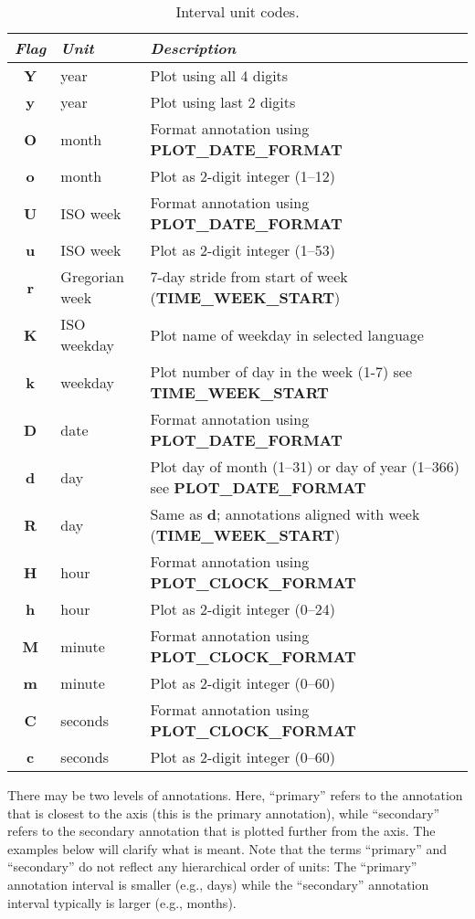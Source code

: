 \begin{table}[h]
\centering
\begin{tabular}{|c|l|l|} \hline
\emph{Flag}	& \emph{Unit} & \emph{Description} \\ \hline
\textbf{Y}	&	year		& Plot using all 4 digits \\ \hline
\textbf{y}	&	year		& Plot using last 2 digits \\ \hline
\textbf{O}	&	month		& Format annotation using \textbf{PLOT\_DATE\_FORMAT} \\ \hline
\textbf{o}	&	month		& Plot as 2-digit integer (1--12) \\ \hline
\textbf{U}	&	ISO week	& Format annotation using \textbf{PLOT\_DATE\_FORMAT} \\ \hline
\textbf{u}	&	ISO week	& Plot as 2-digit integer (1--53) \\ \hline
\textbf{r}	&	Gregorian week	& 7-day stride from start of week (\textbf{TIME\_WEEK\_START}) \\ \hline
\textbf{K}	&	ISO weekday	& Plot name of weekday in selected language \\ \hline
\textbf{k}	&	weekday		& Plot number of day in the week (1-7)  {see \bf TIME\_WEEK\_START}\\ \hline
\textbf{D}	&	date		& Format annotation using \textbf{PLOT\_DATE\_FORMAT} \\ \hline
\textbf{d}	&	day		& Plot day of month (1--31) or day of year (1--366) {see \bf PLOT\_DATE\_FORMAT} \\ \hline
\textbf{R}	&	day		& Same as \textbf{d}; annotations aligned with week (\textbf{TIME\_WEEK\_START})\\ \hline
\textbf{H}	&	hour		& Format annotation using \textbf{PLOT\_CLOCK\_FORMAT} \\ \hline
\textbf{h}	&	hour		& Plot as 2-digit integer (0--24) \\ \hline
\textbf{M}	&	minute		& Format annotation using \textbf{PLOT\_CLOCK\_FORMAT} \\ \hline
\textbf{m}	&	minute		& Plot as 2-digit integer (0--60) \\ \hline
\textbf{C}	&	seconds		& Format annotation using \textbf{PLOT\_CLOCK\_FORMAT} \\ \hline
\textbf{c}	&	seconds		& Plot as 2-digit integer (0--60) \\ \hline
\end{tabular}
\caption{Interval unit codes.}
\label{tbl:units}
\end{table}

There may be two levels of annotations.  Here, ``primary'' refers to the annotation
that is closest to the axis (this is the primary annotation), while ``secondary'' refers to the secondary
annotation that is plotted further from the axis.  The examples below
will clarify what is meant.  Note that the terms ``primary'' and ``secondary'' do not reflect any hierarchical
order of units: The ``primary'' annotation interval is smaller (e.g., days) while the
``secondary'' annotation interval typically is larger (e.g., months).

